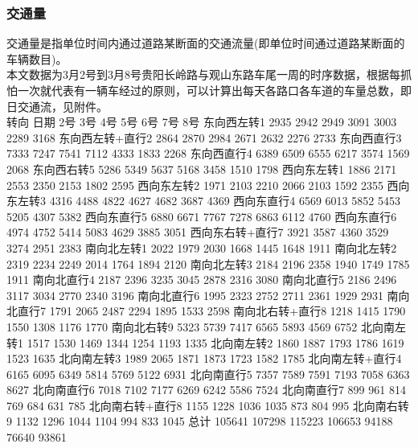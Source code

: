 \documentclass[UTF8]{article}
\begin{document}
    \subsubsection{交通量}
    交通量是指单位时间内通过道路某断面的交通流量(即单位时间通过道路某断面的车辆数目)。\\
    本文数据为3月2号到3月8号贵阳长岭路与观山东路车尾一周的时序数据，根据每抓怕一次就代表有一辆车经过的原则，可以计算出每天各路口各车道的车量总数，即日交通流，见附件。\\
    转向     日期	2号	3号	4号	5号	6号	7号	8号
东向西左转1	2935	2942	2949	3091	3003	2289	3168
东向西左转+直行2	2864	2870	2984	2671	2632	2276	2733
东向西直行3	7333	7247	7541	7112	4333	1833	2268
东向西直行4	6389	6509	6555	6217	3574	1569	2068
东向西右转5	5286	5349	5637	5168	3458	1510	1798
西向东左转1	1886	2171	2553	2350	2153	1802	2595
西向东左转2	1971	2103	2210	2066	2103	1592	2355
西向东左转3	4316	4488	4822	4627	4682	3687	4369
西向东直行4	6569	6013	5852	5453	5205	4307	5382
西向东直行5	6880	6671	7767	7278	6863	6112	4760
西向东直行6	4974	4752	5414	5083	4629	3885	3051
西向东右转+直行7	3921	3587	4360	3529	3274	2951	2383
南向北左转1	2022	1979	2030	1668	1445	1648	1911
南向北左转2	2319	2234	2249	2014	1764	1894	2120
南向北左转3	2184	2196	2358	1940	1749	1785	1911
南向北直行4	2187	2396	3235	3045	2878	2316	3080
南向北直行5	2186	2496	3117	3034	2770	2340	3196
南向北直行6	1995	2323	2752	2711	2361	1929	2931
南向北直行7	1791	2065	2487	2294	1895	1533	2598
南向北右转+直行8	1218	1415	1790	1550	1308	1176	1770
南向北右转9	5323	5739	7417	6565	5893	4569	6752
北向南左转1	1517	1530	1469	1344	1254	1193	1335
北向南左转2	1860	1887	1793	1786	1619	1523	1635
北向南左转3	1989	2065	1871	1873	1723	1582	1785
北向南左转+直行4	6165	6095	6349	5814	5769	5122	6931
北向南直行5	7357	7589	7591	7193	7058	6363	8627
北向南直行6	7018	7102	7177	6269	6242	5586	7524
北向南直行7	899	961	814	769	684	631	785
北向南右转+直行8	1155	1228	1036	1035	873	804	995
北向南右转9	1132	1296	1044	1104	994	833	1045
总计	105641	107298	115223	106653	94188	76640	93861


    
\end{document}
